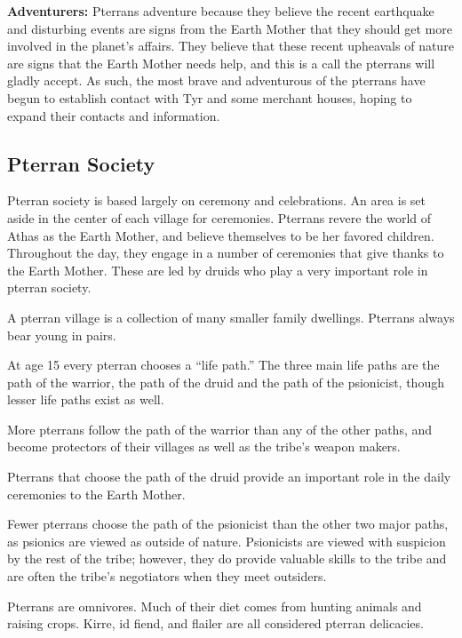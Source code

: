 \textbf{Adventurers:} Pterrans adventure because they believe the recent earthquake and disturbing events are signs from the Earth Mother that they should get more involved in the planet's affairs. They believe that these recent upheavals of nature are signs that the Earth Mother needs help, and this is a call the pterrans will gladly accept. As such, the most brave and adventurous of the pterrans have begun to establish contact with Tyr and some merchant houses, hoping to expand their contacts and information.

\subsection{Pterran Society}
Pterran society is based largely on ceremony and celebrations. An area is set aside in the center of each village for ceremonies. Pterrans revere the world of Athas as the Earth Mother, and believe themselves to be her favored children. Throughout the day, they engage in a number of ceremonies that give thanks to the Earth Mother. These are led by druids who play a very important role in pterran society.

A pterran village is a collection of many smaller family dwellings. Pterrans always bear young in pairs.

At age 15 every pterran chooses a ``life path.'' The three main life paths are the path of the warrior, the path of the druid and the path of the psionicist, though lesser life paths exist as well.

More pterrans follow the path of the warrior than any of the other paths, and become protectors of their villages as well as the tribe's weapon makers.

Pterrans that choose the path of the druid provide an important role in the daily ceremonies to the Earth Mother.

Fewer pterrans choose the path of the psionicist than the other two major paths, as psionics are viewed as outside of nature. Psionicists are viewed with suspicion by the rest of the tribe; however, they do provide valuable skills to the tribe and are often the tribe's negotiators when they meet outsiders.

Pterrans are omnivores. Much of their diet comes from hunting animals and raising crops. Kirre, id fiend, and flailer are all considered pterran delicacies.

